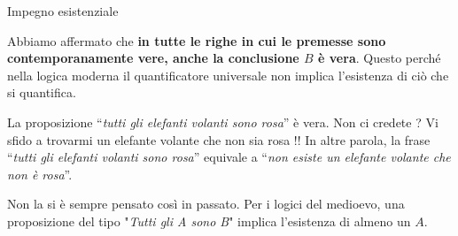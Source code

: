 \documentclass[10pt,dvipsnames,xcolor=table]{beamer}
\begin{document}
\begin{frame}{Impegno esistenziale}
    \medskip

    \medskip
    Abbiamo affermato che \textbf{in tutte le righe in cui le premesse sono contemporanamente vere, anche la conclusione $B$ è vera}. Questo perché nella logica moderna il quantificatore universale non implica l'esistenza di ciò che si quantifica.

    \medskip
    La proposizione ``\emph{tutti gli elefanti volanti sono rosa}'' è vera. Non ci credete ? Vi sfido a trovarmi un elefante volante che non sia rosa !! In altre parola, la frase ``\emph{tutti gli elefanti volanti sono rosa}'' equivale a ``\emph{non esiste un elefante volante che non è rosa}''.


    \medskip
    Non la si è sempre pensato così in passato. Per i logici del medioevo, una proposizione del tipo "\emph{Tutti gli A sono B}" implica l'esistenza di almeno un $A$.
\end{frame}
\end{document}
